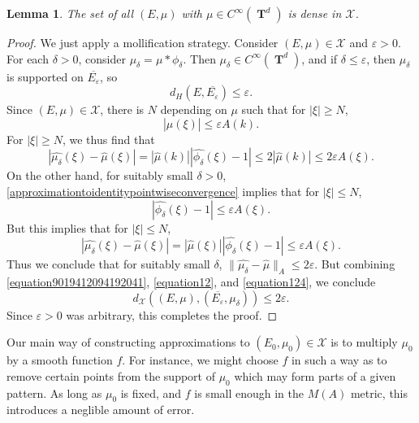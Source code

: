 \documentclass[12pt,reqno]{article}
\numberwithin{equation}{section}
\DeclareMathOperator{\TT}{\mathbf{T}}
\newtheorem{lemma}[theorem]{Lemma}
\begin{document}
\begin{lemma} \label{smoothdensitylemma}
    The set of all $(E,\mu)$ with $\mu \in C^\infty(\TT^d)$ is dense in $\mathcal{X}$.
\end{lemma}
\begin{proof}
    We just apply a mollification strategy. Consider $(E,\mu) \in \mathcal{X}$ and $\varepsilon > 0$. For each $\delta > 0$, consider $\mu_\delta = \mu * \phi_\delta$. Then $\mu_\delta \in C^\infty(\TT^d)$, and if $\delta \leq \varepsilon$, then $\mu_\delta$ is supported on $\overline{E_\varepsilon}$, so
    \begin{equation} \label{equation9019412094192041}
        d_H(E,\overline{E_\varepsilon}) \leq \varepsilon.
    \end{equation}
    Since $(E,\mu) \in \mathcal{X}$, there is $N$ depending on $\mu$ such that for $|\xi| \geq N$,
    \[ |\widehat{\mu}(\xi)| \leq \varepsilon A(k). \]
    For $|\xi| \geq N$, we thus find that
    \begin{equation} \label{equation12}
        |\widehat{\mu_\delta}(\xi) - \widehat{\mu}(\xi)| = |\widehat{\mu}(k)||\widehat{\phi_\delta}(\xi) - 1| \leq 2 |\widehat{\mu}(k)| \leq 2\varepsilon A(\xi).
    \end{equation}
    On the other hand, for suitably small $\delta > 0$, \eqref{approximationtoidentitypointwiseconvergence} implies that for $|\xi| \leq N$,
    \[ |\widehat{\phi_\delta}(\xi) - 1| \leq \varepsilon A(\xi). \]
    But this implies that for $|\xi| \leq N$,
    \begin{equation} \label{equation124}
        |\widehat{\mu_\delta}(\xi) - \widehat{\mu}(\xi)| = |\widehat{\mu}(\xi)| |\widehat{\phi_\delta}(\xi) - 1| \leq \varepsilon A(\xi).
    \end{equation}
    Thus we conclude that for suitably small $\delta$, $\| \widehat{\mu_\delta} - \widehat{\mu} \|_A \leq 2 \varepsilon$. But combining \eqref{equation9019412094192041}, \eqref{equation12}, and \eqref{equation124}, we conclude
    \[ d_{\mathcal{X}}((E,\mu), (\overline{E_\varepsilon}, \mu_\delta)) \leq 2 \varepsilon. \]
    Since $\varepsilon > 0$ was arbitrary, this completes the proof.
\end{proof}

Our main way of constructing approximations to $(E_0,\mu_0) \in \mathcal{X}$ is to multiply $\mu_0$ by a smooth function $f$. For instance, we might choose $f$ in such a way as to remove certain points from the support of $\mu_0$ which may form parts of a given pattern. As long as $\mu_0$ is fixed, and $f$ is small enough in the $M(A)$ metric, this introduces a neglible amount of error.
\end{document}
